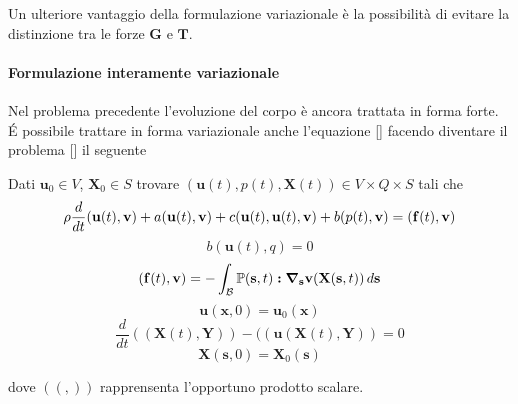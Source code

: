 Un ulteriore vantaggio della formulazione variazionale è la possibilità di evitare la distinzione tra le forze $\mathbf{G}$ e $\mathbf{T}$.

\paragraph{Formulazione interamente variazionale}
Nel problema precedente l'evoluzione del corpo è ancora trattata in forma forte. \'E possibile trattare in forma variazionale anche l'equazione [] facendo diventare il problema [] il seguente
\begin{problem}
Dati $\mathbf{u}_0\in V$, $\mathbf{X}_0\in S$ trovare $(\mathbf{u}(t),p(t),\mathbf{X}(t))\in V\times Q\times S$ tali che
$$\rho\frac{d}{dt}\ps{\mathbf{u}(t)}{\mathbf{v}}+a\ps{\mathbf{u}(t)}{\mathbf{v}}+c({\mathbf{u}(t)},{\mathbf{u}(t)},{\mathbf{v}})+b(p(t),\mathbf{v})=\ps{\mathbf{f}(t)}{\mathbf{v}}$$
$$b(\mathbf{u}(t),q)=0$$
$$\ps{\mathbf{f}(t)}{\mathbf{v}}=-\int_{\mathcal{B}}\mathbb{P}(\mathbf{s},t)\boldsymbol{:}\Nabla_{\mathbf{s}}\mathbf{v}(\mathbf{X}(\mathbf{s},t))\, d\mathbf{s}$$
$$\mathbf{u}(\mathbf{x},0)=\mathbf{u}_0(\mathbf{x})$$
$$\frac{d}{dt}((\mathbf{X}(t),\mathbf{Y}))-((\mathbf{u}(\mathbf{X}(t),\mathbf{Y}))=0$$
$$\mathbf{X}(\mathbf{s},0)=\mathbf{X}_0(\mathbf{s})$$
\end{problem}
dove $(( , ))$ rapprensenta l'opportuno prodotto scalare.

